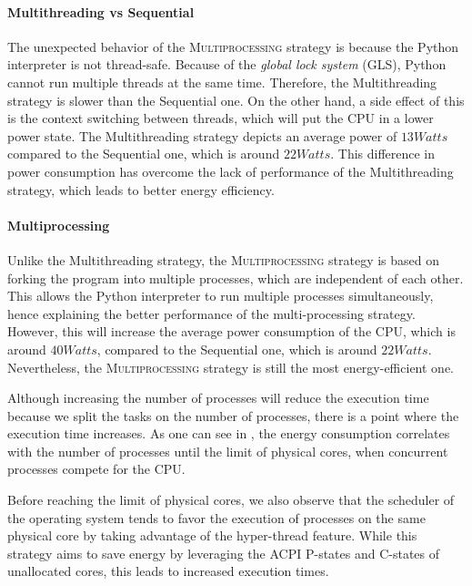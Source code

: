 \paragraph*{Multithreading vs Sequential}
The unexpected behavior of the \textsc{Multiprocessing} strategy is because the Python interpreter is not thread-safe.
Because of the \emph{global lock system} (GLS), Python cannot run multiple threads at the same time.
Therefore, the \textsf{Multithreading} strategy is slower than the \textsf{Sequential} one.
On the other hand, a side effect of this is the context switching between threads, which will put the CPU in a lower power state.
The \textsf{Multithreading} strategy depicts an average power of $13 Watts$ compared to the \textsf{Sequential} one, which is around $22 Watts$.
This difference in power consumption has overcome the lack of performance of the \textsf{Multithreading} strategy, which leads to better energy efficiency.


\paragraph*{Multiprocessing}
Unlike the \textsf{Multithreading} strategy, the \textsc{Multiprocessing} strategy is based on forking the program into multiple processes, which are independent of each other. 
This allows the Python interpreter to run multiple processes simultaneously, hence explaining the better performance of the multi-processing strategy.
However, this will increase the average power consumption of the CPU, which is around $40 Watts$, compared to the \textsf{Sequential} one, which is around $22 Watts$.
Nevertheless, the \textsc{Multiprocessing} strategy is still the most energy-efficient one.

Although increasing the number of processes will reduce the execution time because we split the tasks on the number of processes, there is a point where the execution time increases.
As one can see in , the energy consumption correlates with the number of processes until the limit of physical cores, when concurrent processes compete for the CPU.

Before reaching the limit of physical cores, we also observe that the scheduler of the operating system tends to favor the execution of processes on the same physical core by taking advantage of the hyper-thread feature.
While this strategy aims to save energy by leveraging the ACPI P-states and C-states of unallocated cores, this leads to increased execution times.

